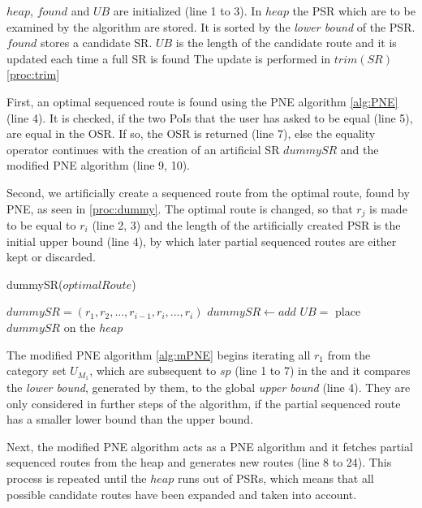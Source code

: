 \pagebreak

$heap$, $found$ and $UB$ are initialized (line 1 to 3). In $heap$ the PSR which are to be examined by the algorithm are stored. It is sorted by the \textit{lower bound} of the PSR. $found$ stores a candidate SR. $UB$ is the length of the candidate route and it is updated each time a full SR is found The update is performed in $trim(SR)$ \ref{proc:trim}

First, an optimal sequenced route is found using the PNE algorithm \ref{alg:PNE} (line 4). It is checked, if the two PoIs that the user has asked to be equal (line 5), are equal in the OSR. If so, the OSR is returned (line 7), else the equality operator continues with the creation of an artificial SR $dummySR$ and the modified PNE algorithm (line 9, 10). 

Second, we artificially create a sequenced route from the optimal route, found by PNE, as seen in \ref{proc:dummy}. The optimal route is changed, so that $r_j$ is made to be equal to $r_i$ (line 2, 3) and the length of the artificially created PSR is the initial upper bound (line 4), by which later partial sequenced routes are either kept or discarded.

\begin{procedure}[htb!]
	\label{proc:dummy}
	\caption{dummySR($optimalRoute$)}
	
	$dummySR = (r_1, r_2, ..., r_{i-1}, r_i, ..., r_i)$ 
	$dummySR \leftarrow add$ \;
	$UB =$ \;
	place $dummySR$ on the $heap$\;
\end{procedure}

The modified PNE algorithm \ref{alg:mPNE} begins iterating all $r_1$ from the category set $U_{M_1}$, which are subsequent to $sp$ (line 1 to 7) in the and it compares the \textit{lower bound}, generated by them, to the global \textit{upper bound} (line 4). They are only considered in further steps of the algorithm, if the partial sequenced route has a smaller lower bound than the upper bound.

Next, the modified PNE algorithm acts as a PNE algorithm and it fetches partial sequenced routes from the heap and generates new routes (line 8 to 24). This process is repeated until the $heap$ runs out of PSRs, which means that all possible candidate routes have been expanded and taken into account.

